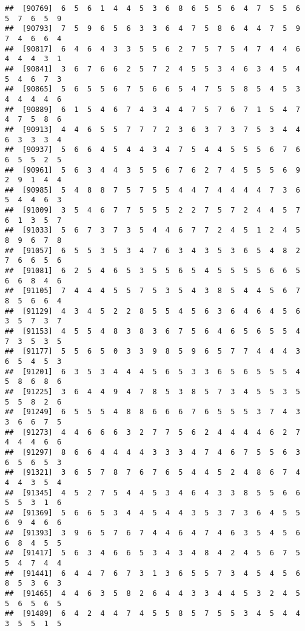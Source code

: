 \documentclass[
]{book}
\begin{document}
\begin{verbatim}
##  [90769]  6  5  6  1  4  4  5  3  6  8  6  5  5  6  4  7  5  5  6  5  7  6  5  9
##  [90793]  7  5  9  6  5  6  3  3  6  4  7  5  8  6  4  4  7  5  9  7  4  6  6  4
##  [90817]  6  4  6  4  3  3  5  5  6  2  7  5  7  5  4  7  4  4  6  4  4  4  3  1
##  [90841]  3  6  7  6  6  2  5  7  2  4  5  5  3  4  6  3  4  5  4  5  4  6  7  3
##  [90865]  5  6  5  5  6  7  5  6  6  5  4  7  5  5  8  5  4  5  3  4  4  4  4  6
##  [90889]  6  1  5  4  6  7  4  3  4  4  7  5  7  6  7  1  5  4  7  4  7  5  8  6
##  [90913]  4  4  6  5  5  7  7  7  2  3  6  3  7  3  7  5  3  4  4  6  3  3  3  4
##  [90937]  5  6  6  4  5  4  4  3  4  7  5  4  4  5  5  5  6  7  6  6  5  5  2  5
##  [90961]  5  6  3  4  4  3  5  5  6  7  6  2  7  4  5  5  5  6  9  2  9  1  4  4
##  [90985]  5  4  8  8  7  5  7  5  5  4  4  7  4  4  4  4  7  3  6  5  4  4  6  3
##  [91009]  3  5  4  6  7  7  5  5  5  2  2  7  5  7  2  4  4  5  7  6  1  3  5  7
##  [91033]  5  6  7  3  7  3  5  4  4  6  7  7  2  4  5  1  2  4  5  8  9  6  7  8
##  [91057]  6  5  5  3  5  3  4  7  6  3  4  3  5  3  6  5  4  8  2  7  6  6  5  6
##  [91081]  6  2  5  4  6  5  3  5  5  6  5  4  5  5  5  5  6  6  5  6  6  8  4  6
##  [91105]  7  4  4  4  5  5  7  5  3  5  4  3  8  5  4  4  5  6  7  8  5  6  6  4
##  [91129]  4  3  4  5  2  2  8  5  5  4  5  6  3  6  4  6  4  5  6  3  5  7  3  7
##  [91153]  4  5  5  4  8  3  8  3  6  7  5  6  4  6  5  6  5  5  4  7  3  5  3  5
##  [91177]  5  5  6  5  0  3  3  9  8  5  9  6  5  7  7  4  4  4  3  6  5  4  5  3
##  [91201]  6  3  5  3  4  4  4  5  6  5  3  3  6  5  6  5  5  5  4  5  8  6  8  6
##  [91225]  3  6  4  4  9  4  7  8  5  3  8  5  7  3  4  5  5  3  5  5  5  8  2  6
##  [91249]  6  5  5  5  4  8  8  6  6  6  7  6  5  5  5  3  7  4  3  3  6  6  7  5
##  [91273]  4  4  6  6  6  3  2  7  7  5  6  2  4  4  4  4  6  2  7  4  4  4  6  6
##  [91297]  8  6  6  4  4  4  4  3  3  3  4  7  4  6  7  5  5  6  3  6  5  6  5  3
##  [91321]  3  6  5  7  8  7  6  7  6  5  4  4  5  2  4  8  6  7  4  4  4  3  5  4
##  [91345]  4  5  2  7  5  4  4  5  3  4  6  4  3  3  8  5  5  6  6  5  5  3  1  6
##  [91369]  5  6  6  5  3  4  4  5  4  4  3  5  3  7  3  6  4  5  5  6  9  4  6  6
##  [91393]  3  9  6  5  7  6  7  4  4  6  4  7  4  6  3  5  4  5  6  6  8  4  5  5
##  [91417]  5  6  3  4  6  6  5  3  4  3  4  8  4  2  4  5  6  7  5  5  4  7  4  4
##  [91441]  6  4  4  7  6  7  3  1  3  6  5  5  7  3  4  5  4  5  6  8  5  3  6  3
##  [91465]  4  4  6  3  5  8  2  6  4  4  3  3  4  4  5  3  2  4  5  5  6  5  6  5
##  [91489]  6  4  2  4  4  7  4  5  5  8  5  7  5  5  3  4  5  4  4  3  5  5  1  5

\end{verbatim}
\end{document}
